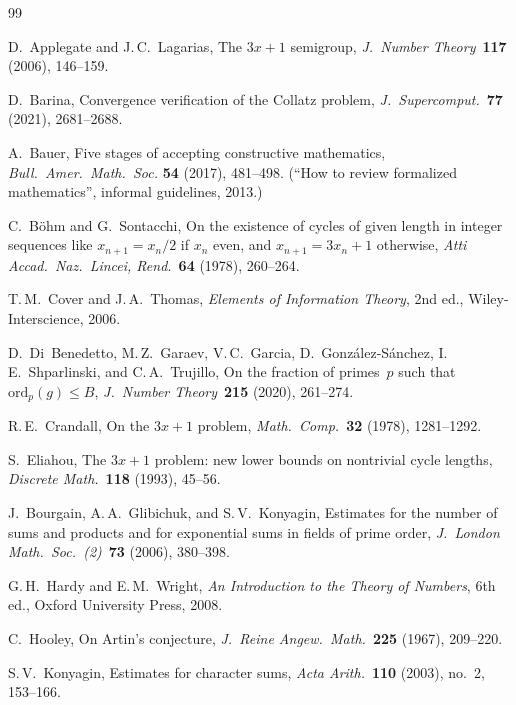 \documentclass[12pt, a4paper]{amsart}
\theoremstyle{plain}
\theoremstyle{definition}
\theoremstyle{remark}
\begin{document}
\begin{thebibliography}{99}

  D.~Applegate and J.\,C.~Lagarias,
  The $3x+1$ semigroup,
  \emph{J.\ Number Theory}\ \textbf{117} (2006), 146--159.

  D.~Barina,
  Convergence verification of the Collatz problem,
  \emph{J.\ Supercomput.}\ \textbf{77} (2021), 2681--2688.

  A.~Bauer,
  Five stages of accepting constructive mathematics,
  \textit{Bull.\ Amer.\ Math.\ Soc.}
  \textbf{54} (2017), 481--498.
  (``How to review formalized mathematics'', informal
  guidelines, 2013.)

  C.~B\"ohm and G.~Sontacchi,
  On the existence of cycles of given length in integer
  sequences like $x_{n+1} = x_n/2$ if $x_n$ even, and
  $x_{n+1} = 3x_n + 1$ otherwise,
  \emph{Atti Accad.\ Naz.\ Lincei, Rend.}\ \textbf{64}
  (1978), 260--264.

  T.\,M.~Cover and J.\,A.~Thomas,
  \emph{Elements of Information Theory},
  2nd ed.,
  Wiley-Interscience, 2006.

  D.~Di~Benedetto, M.\,Z.~Garaev, V.\,C.~Garcia,
  D.~Gonz\'alez-S\'anchez, I.\,E.~Shparlinski,
  and C.\,A.~Trujillo,
  On the fraction of primes~$p$ such that
  $\mathrm{ord}_p(g) \leq B$,
  \emph{J.\ Number Theory}\ \textbf{215} (2020), 261--274.

  R.\,E.~Crandall,
  On the $3x+1$ problem,
  \emph{Math.\ Comp.}\ \textbf{32} (1978), 1281--1292.

  S.~Eliahou,
  The $3x+1$ problem: new lower bounds on nontrivial cycle
  lengths,
  \emph{Discrete Math.}\ \textbf{118} (1993), 45--56.

  J.~Bourgain, A.\,A.~Glibichuk, and S.\,V.~Konyagin,
  Estimates for the number of sums and products and for
  exponential sums in fields of prime order,
  \emph{J.\ London Math.\ Soc.\ (2)}\ \textbf{73} (2006),
  380--398.

  G.\,H.~Hardy and E.\,M.~Wright,
  \emph{An Introduction to the Theory of Numbers},
  6th ed., Oxford University Press, 2008.

  C.~Hooley,
  On Artin's conjecture,
  \emph{J.\ Reine Angew.\ Math.}\ \textbf{225} (1967), 209--220.

  S.\,V.~Konyagin,
  Estimates for character sums,
  \emph{Acta Arith.}\ \textbf{110} (2003), no.~2, 153--166.


\end{thebibliography}
\end{document}
